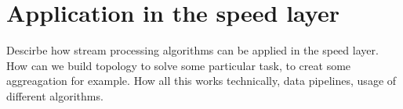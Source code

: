 \section{Application in the speed layer}

Descirbe how stream processing algorithms can be applied in the speed layer.
How can we build topology to solve some particular task, to creat some aggreagation for example.
How all this works technically, data pipelines, usage of different algorithms.
